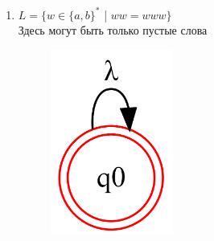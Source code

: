 \documentclass[a4paper]{article}
\begin{document}
\begin{enumerate}
\item {$L = \{ w \in \{a,b\}^*$ | $  {ww = www} \}$} \\
Здесь могут быть только пустые слова 
\begin{figure}[h]
\centering
\includegraphics[width=4cm]{Задание_№1_4.png}
\end{figure}
\end{enumerate}
\newpage


\newpage
\end{document}
